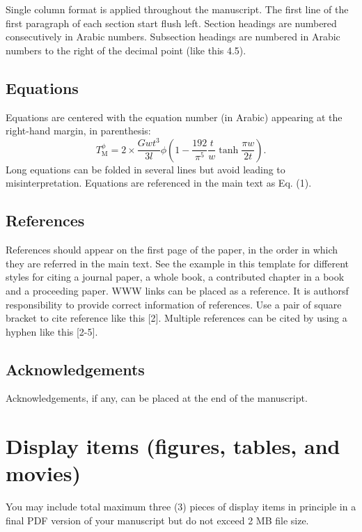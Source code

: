 \documentclass{elex}
\begin{document}
Single column format is applied throughout the manuscript. The first line of the first paragraph of each section start flush left.  Section headings are numbered consecutively in Arabic numbers.  Subsection headings are numbered in Arabic numbers to the right of the decimal point (like this 4.5).

\subsection{Equations}

Equations are centered with the equation number (in Arabic) appearing at the right-hand margin, in parenthesis:
\begin{equation}
T_{\mbox{M}}^{\phi} = 2 \times \frac{G w t^3}{3 l} \phi \left( 1 - \frac{192}{\pi^5} {\frac{t}{w}} \tanh \frac{\pi w}{2 t} \right).
\end{equation}
\noindent
Long equations can be folded in several lines but avoid leading to
misinterpretation.  Equations are referenced in the main text as Eq. (1).


\subsection{References}

References should appear on the first page of the paper, in the order in which they are referred in the main text.  See the example in this template for different styles for citing a journal paper, a whole book, a contributed chapter in a book and a proceeding paper.  WWW links can be placed as a reference.  It is authorsf responsibility to provide correct information of references. Use a pair of square bracket to cite reference like this [2].  Multiple references can be cited by using a hyphen like this [2-5].


\subsection{Acknowledgements}

Acknowledgements, if any, can be placed at the end of the manuscript.


\section{Display items (figures, tables, and movies)}

You may include total maximum three (3) pieces of display items in principle in a final PDF version of your manuscript but do not exceed 2 MB file size.
\end{document}
